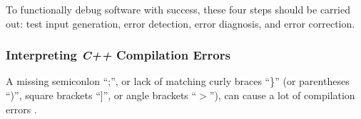	To  functionally debug software with success, these four steps should be carried out: test input generation, error detection, error diagnosis, and error correction.

\subsubsection{Interpreting {\it C++} Compilation Errors}
\label{sssec:InterpretingCppCompilationErrors}

	A missing semiconlon ``;'', or lack of matching curly braces ``\}'' (or parentheses ``)'', square brackets ``]'', or angle brackets ``$>$''), can cause a lot of compilation errors \cite{Husted2000}.

















































